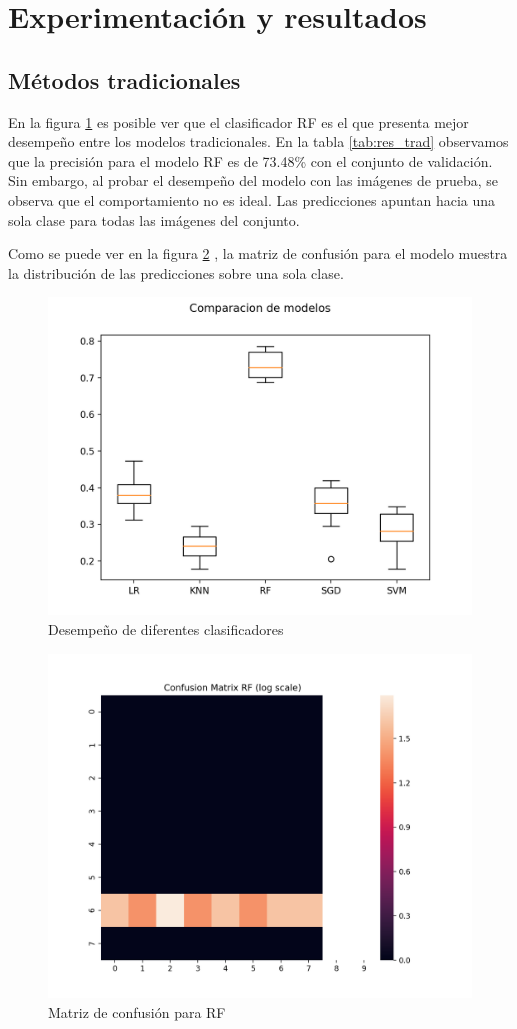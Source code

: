 \documentclass[transmag]{IEEEtran}
\begin{document}
\section{Experimentación y resultados}

\subsection{Métodos tradicionales}

En la figura \ref{fig:trad} es posible ver que el clasificador RF es el que presenta mejor desempeño entre los modelos tradicionales. En la tabla \ref{tab:res_trad} observamos que la precisión para el modelo RF es de 73.48\% con el conjunto de validación. Sin embargo, al probar el desempeño del modelo con las imágenes de prueba, se observa que el comportamiento no es ideal. Las predicciones apuntan hacia una sola clase para todas las imágenes del conjunto. 

Como se puede ver en la figura \ref{fig:conf_rf} , la matriz de confusión para el modelo muestra la distribución de las predicciones sobre una sola clase.

\begin{figure}[H]
	\centering
	\includegraphics[width=0.8\linewidth]{finaltrad}
	\caption{Desempeño de diferentes clasificadores}
	\label{fig:trad}
\end{figure}


\begin{figure}[H]
\centering
\includegraphics[width=0.8\linewidth]{finaltradconf}
\caption{Matriz de confusión para RF}
\label{fig:conf_rf}
\end{figure}
\end{document}

